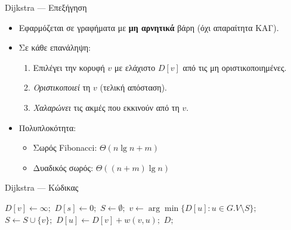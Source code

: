 \documentclass{beamer}
\makeatletter
\newenvironment{yellowalgo}{
    \begin{tcolorbox}[colback=myyellow, colframe=myyellow, boxrule=0.5pt]
    \begin{algorithmic}[1]
    \setcounter{ALG@line}{-1}
}{
    \end{algorithmic}
    \end{tcolorbox}
}
\makeatother
\begin{document}
\begin{frame}{Dijkstra --- Επεξήγηση}
\begin{itemize}
    \item Εφαρμόζεται σε γραφήματα με \textbf{μη αρνητικά} βάρη (όχι απαραίτητα ΚΑΓ).
    \item Σε κάθε επανάληψη:
    \begin{enumerate}
        \item Επιλέγει την κορυφή $v$ με ελάχιστο $D[v]$ από τις μη οριστικοποιημένες.
        \item \emph{Οριστικοποιεί} τη $v$ (τελική απόσταση).
        \item \emph{Χαλαρώνει} τις ακμές που εκκινούν από τη $v$.
    \end{enumerate}
    \item Πολυπλοκότητα:
    \begin{itemize}
        \item Σωρός Fibonacci: $\Theta(n \lg n + m)$
        \item Δυαδικός σωρός: $\Theta((n+m)\lg n)$
    \end{itemize}
\end{itemize}
\end{frame}

\begin{frame}{Dijkstra --- Κώδικας}
\begin{yellowalgo}
        \State $D[v] \gets \infty;$
    \EndFor
    \State $D[s] \gets 0;$
    \State $S \gets \emptyset;$
        \State $v \gets {\arg\min}\{D[u] : u \in G.V \setminus S\};$
        \State $S \gets S \cup \{v\};$
                \State $D[u] \gets D[v] + w(v, u);$
            \EndIf
        \EndFor
    \EndWhile
    \State \Return $D;$
\EndFunction
\end{yellowalgo}
\end{frame}
\end{document}
